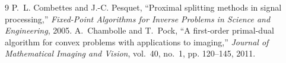 \documentclass{article}
\begin{document}
\begin{thebibliography}{9}
P.~L. Combettes and J.-C. Pesquet, ``Proximal splitting methods in signal processing,'' \emph{Fixed-Point Algorithms for Inverse Problems in Science and Engineering}, 2005.
A.~Chambolle and T.~Pock, ``A first-order primal-dual algorithm for convex problems with applications to imaging,'' \emph{Journal of Mathematical Imaging and Vision}, vol.~40, no.~1, pp. 120–145, 2011.
\end{thebibliography}
\end{document}
